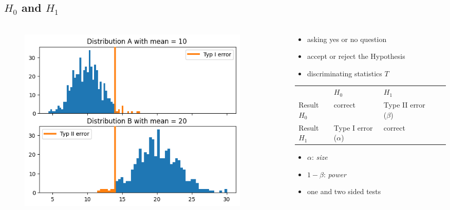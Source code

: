 \subsection{$H_0$ and $H_1$}
\begin{frame}
  \frametitle{\insertsectionhead}
\framesubtitle{\insertsubsectionhead}
\begin{columns}
  \begin{column}{0.5\textwidth}
  \centering
  \begin{figure}
      \centering
      \includegraphics[width=0.9\textwidth]{figs/hypothesis.png}
  \end{figure}
  \end{column}
  \begin{column}{0.5\textwidth}
  \centering
  \begin{itemize}
    \item asking yes or no question
    \item accept or reject the Hypothesis
    \item discriminating statistics $T$
  \end{itemize}
  \begin{table}[]
    \centering
    \begin{tabular}{lllll}
                 & $H_0$                   & $H_1$                   &  &  \\
    Result $H_0$ & correct                 & Type II error ($\beta$) &  &  \\
    Result $H_1$ & Type I error ($\alpha$) & correct                 &  &  
    \end{tabular}
    \end{table}
    \begin{itemize}
      \item $\alpha$: \textit{size}
      \item $1-\beta$: \textit{power}
      \item one and two sided tests
    \end{itemize}
  \end{column}
  \end{columns}
\end{frame}
